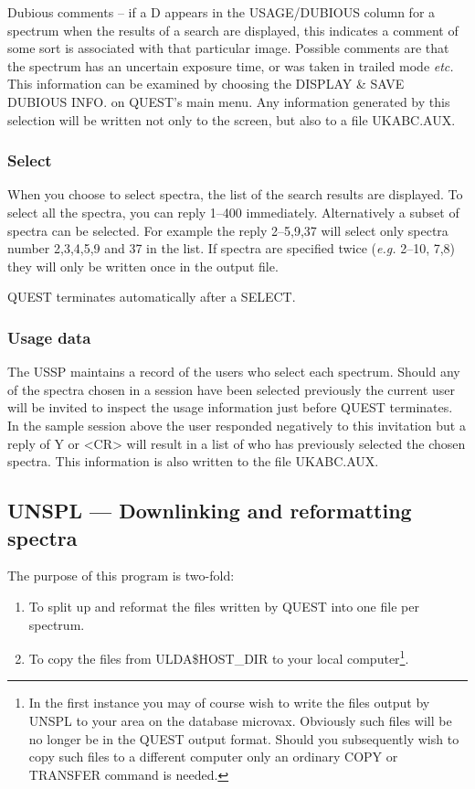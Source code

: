 \documentclass[11pt,nolof,noabs]{starlink}
\begin{document}
Dubious comments -- if a D appears in the USAGE/DUBIOUS column for
a spectrum when
the results of a search are displayed,
this indicates a comment of some sort is associated with that particular image.
Possible comments are that the spectrum has an  uncertain exposure time, or
was taken in trailed mode \textit{etc.}
This information can be examined by choosing
the DISPLAY \& SAVE DUBIOUS INFO. on QUEST's main menu.
Any information generated by this selection will be written not
only to the screen, but also to a file UKABC.AUX.

\subsubsection{Select}

When you choose to select spectra,
the list of the search results are displayed.
To select all the spectra, you can reply 1--400 immediately.
Alternatively a subset of spectra can be selected. For example the reply
2--5,9,37 will select only spectra number 2,3,4,5,9 and 37 in the list.
If spectra are specified twice (\textit{e.g.} 2--10, 7,8) they will
only be written once in the output file.

QUEST terminates automatically after a SELECT.

\subsubsection {Usage data}

The USSP maintains a record of the users who select each spectrum.
Should any of the spectra chosen in a session have been selected previously
the current user will be invited to inspect the usage information just before
QUEST terminates.
In the sample session above the user responded negatively to this
invitation but a reply of Y or <CR> will result
in a list of who has previously selected the chosen spectra.
This information is also written to the file UKABC.AUX.


\subsection{UNSPL --- Downlinking and reformatting spectra}

The purpose of this program is two-fold:
\begin{enumerate}
\item To split up and reformat the  files written by QUEST into
one file per spectrum.

\item To copy the files from ULDA\$HOST\_DIR to your local
computer\footnote{In the first instance you may of course wish to write the files output by UNSPL
to your area on the database microvax.
Obviously such files will be no longer be in the QUEST output format.
Should you subsequently wish to copy such files to a different computer only
an ordinary COPY or TRANSFER command is needed.}.
\end{enumerate}
\end{document}
